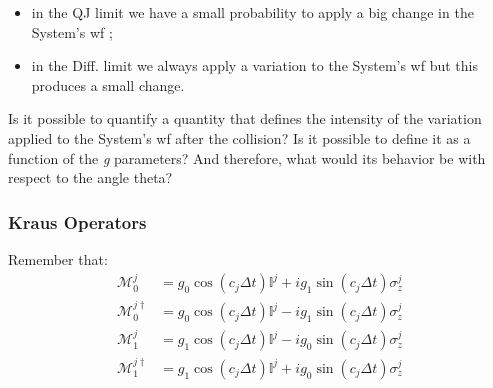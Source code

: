 \documentclass[a4paper,12pt]{article}
\begin{document}
\begin{itemize}
	\item in the QJ limit we have a small probability to apply a big change in the System's wf ;
	\item in the Diff. limit we always apply a variation to the System's wf but this produces a small change.
\end{itemize}

Is it possible to quantify a quantity that defines the intensity of the variation applied to the System's wf after the collision? Is it possible to define it as a function of the \textit{g} parameters? And therefore, what would its behavior be with respect to the angle theta?

\subsubsection{Kraus Operators}
\label{sub:focus_on_M0_M1}
Remember that:
\begin{align*}
	\mathcal{M}_{0}^{j} &= g_0 \cos(c_j \Delta t) \mathbb{I}^{j} + i g_1 \sin(c_j \Delta t) \sigma_{z}^{j} \\
	\mathcal{M}_0^{j \dagger} &= g_0 \cos(c_j \Delta t) \mathbb{I}^{j} - i g_1 \sin(c_j \Delta t) \sigma_{z}^{j} \\
	\mathcal{M}_{1}^{j} &= g_1 \cos(c_j \Delta t) \mathbb{I}^{j} - i g_0 \sin(c_j \Delta t) \sigma_{z}^{j} \\
	\mathcal{M}_1^{j \dagger} &= g_1 \cos(c_j \Delta t) \mathbb{I}^{j} + i g_0 \sin(c_j \Delta t) \sigma_{z}^{j}
\end{align*}
\end{document}
